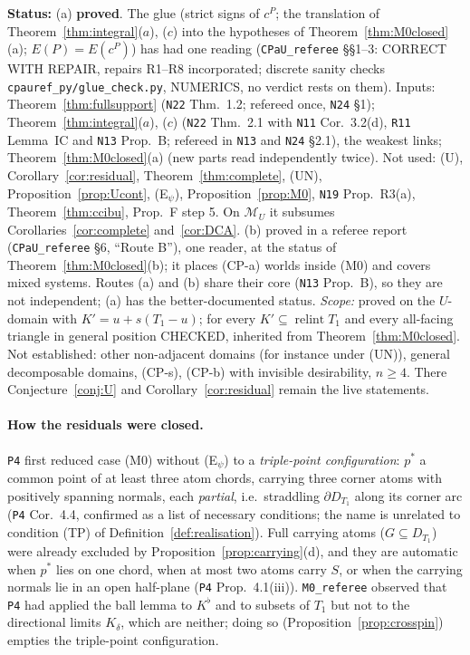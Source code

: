 \documentclass[11pt]{article}
\theoremstyle{definition}
\theoremstyle{remark}
\newcommand{\M}{\mathcal M}
\newcommand{\relint}{\operatorname{relint}}
\newcommand{\src}[1]{\texttt{#1}}
\newcommand{\status}[1]{\par\smallskip\noindent\textbf{Status:} #1\par\smallskip}
\begin{document}
\status{(a) \textbf{proved}. The glue (strict signs of $c^P$; the translation of Theorem~\ref{thm:integral}($a$), ($c$) into the hypotheses of Theorem~\ref{thm:M0closed}(a); $E(P)=E(c^P)$) has had one reading (\src{CPaU\_referee} \S\S1--3: CORRECT WITH REPAIR, repairs R1--R8 incorporated; discrete sanity checks \src{cpauref\_py/glue\_check.py}, NUMERICS, no verdict rests on them). Inputs: Theorem~\ref{thm:fullsupport} (\src{N22} Thm.~1.2; refereed once, \src{N24} \S1); Theorem~\ref{thm:integral}($a$), ($c$) (\src{N22} Thm.~2.1 with \src{N11} Cor.~3.2(d), \src{R11} Lemma~IC and \src{N13} Prop.~B; refereed in \src{N13} and \src{N24} \S2.1), the weakest links; Theorem~\ref{thm:M0closed}(a) (new parts read independently twice). Not used: (U), Corollary~\ref{cor:residual}, Theorem~\ref{thm:complete}, (UN), Proposition~\ref{prop:Ucont}, (E$_\psi$), Proposition~\ref{prop:M0}, \src{N19} Prop.~R3(a), Theorem~\ref{thm:ccibu}, Prop.~F step 5. On $\M_U$ it subsumes Corollaries~\ref{cor:complete} and~\ref{cor:DCA}. (b) proved in a referee report (\src{CPaU\_referee} \S6, ``Route B''), one reader, at the status of Theorem~\ref{thm:M0closed}(b); it places (CP-a) worlds inside (M0) and covers mixed systems. Routes (a) and (b) share their core (\src{N13} Prop.~B), so they are not independent; (a) has the better-documented status. \emph{Scope:} proved on the $U$-domain with $K'=u+s(T_1-u)$; for every $K'\subseteq\relint T_1$ and every all-facing triangle in general position CHECKED, inherited from Theorem~\ref{thm:M0closed}. Not established: other non-adjacent domains (for instance under (UN)), general decomposable domains, (CP-s), (CP-b) with invisible desirability, $n\ge4$. There Conjecture~\ref{conj:U} and Corollary~\ref{cor:residual} remain the live statements.}

\paragraph{How the residuals were closed.} \src{P4} first reduced case (M0) without (E$_\psi$) to a \emph{triple-point configuration}: $p^*$ a common point of at least three atom chords, carrying three corner atoms with positively spanning normals, each \emph{partial}, i.e.\ straddling $\partial D_{T_1}$ along its corner arc (\src{P4} Cor.~4.4, confirmed as a list of necessary conditions; the name is unrelated to condition (TP) of Definition~\ref{def:realisation}). Full carrying atoms ($G\subseteq D_{T_1}$) were already excluded by Proposition~\ref{prop:carrying}(d), and they are automatic when $p^*$ lies on one chord, when at most two atoms carry $S$, or when the carrying normals lie in an open half-plane (\src{P4} Prop.~4.1(iii)). \src{M0\_referee} observed that \src{P4} had applied the ball lemma to $K^\flat$ and to subsets of $T_1$ but not to the directional limits $K_\delta$, which are neither; doing so (Proposition~\ref{prop:crosspin}) empties the triple-point configuration.
\end{document}
